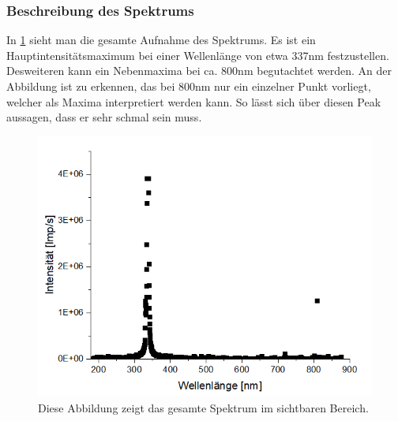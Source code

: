 \documentclass[
	a4paper,
	12pt,
	pagesize,
	ngerman
]{scrartcl}
\begin{document}
\subsubsection{Beschreibung des Spektrums}
In \cref{Spektrumges} sieht man die gesamte Aufnahme des Spektrums. Es ist ein Hauptintensitätsmaximum bei einer Wellenlänge von etwa 337nm festzustellen. Desweiteren kann ein Nebenmaxima bei ca. 800nm begutachtet werden. An der Abbildung ist zu erkennen, das bei 800nm nur ein einzelner Punkt vorliegt, welcher als Maxima interpretiert werden kann. So lässt sich über diesen Peak aussagen, dass er sehr schmal sein muss.
\begin{figure}[h!] 
	\centering
	\includegraphics[scale = 1]{gesamt.png}
	\caption{Diese Abbildung zeigt das gesamte Spektrum im sichtbaren Bereich.}
	\label{Spektrumges}
\end{figure}
\end{document}
